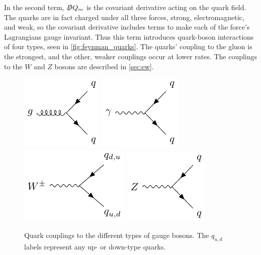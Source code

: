 In the second term, $\slashed{D} Q_m$ is the covariant derivative acting on the quark field. The quarks are in fact charged under all three forces, strong, electromagnetic, and weak, so the covariant derivative includes terms to make each of the force's Lagrangians gauge invariant. Thus this term introduces quark-boson interactions of four types, seen in \autoref{fig:feynman_quarks}. The quarks' coupling to the gluon is the strongest, and the other, weaker couplings occur at lower rates. The couplings to the $W$ and $Z$ bosons are described in \autoref{sec:ew}.

\begin{centering}
\begin{figure}[!hbt]
\myfloatalign
\includegraphics[width=.45\linewidth]{feynman/quark_strong.pdf}
\includegraphics[width=.45\linewidth]{feynman/quark_em.pdf}
\includegraphics[width=.45\linewidth]{feynman/quark_w.pdf}
\includegraphics[width=.45\linewidth]{feynman/quark_z.pdf}
\caption{Quark couplings to the different types of gauge bosons. The $q_{u,d}$ labels represent any up- or down-type quarks.}
\label{fig:feynman_quarks}
\end{figure}
\end{centering}

